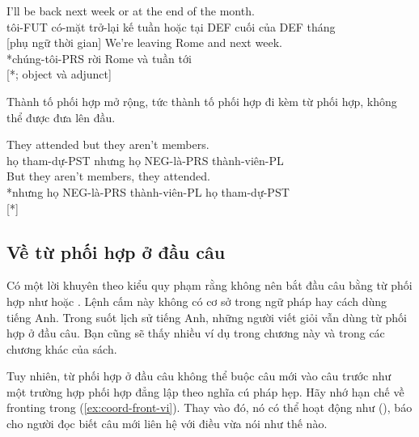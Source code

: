 \ea \label{ex:coordinate-function-vi}
    \ea \gll I'll be back next week or at the end of the month.\\
        tôi-FUT có-mặt trở-lại kế tuần hoặc tại DEF cuối của DEF tháng\\
    \glt {} [phụ ngữ thời gian]
    \ex \gll *We're leaving Rome and next week.\\
        *chúng-tôi-PRS rời Rome và tuần tới\\
    \glt {} [*; object và adjunct]
    \z
\z

Thành tố phối hợp mở rộng, tức thành tố phối hợp đi kèm từ phối hợp, không thể được đưa lên đầu.

\ea \label{ex:coord-front-vi}
    \ea \gll They attended but they aren't members.\\
        họ tham-dự-PST nhưng họ NEG-là-PRS thành-viên-PL\\
    \glt {}
    \ex \gll *But they aren't members, they attended.\\
        *nhưng họ NEG-là-PRS thành-viên-PL họ tham-dự-PST\\
    \glt {} [*]
    \z
\z

\subsection{Về từ phối hợp ở đầu câu}

Có một lời khuyên theo kiểu quy phạm rằng không nên bắt đầu câu bằng từ phối hợp như  hoặc . Lệnh cấm này không có cơ sở trong ngữ pháp hay cách dùng tiếng Anh. Trong suốt lịch sử tiếng Anh, những người viết giỏi vẫn dùng từ phối hợp ở đầu câu. Bạn cũng sẽ thấy nhiều ví dụ trong chương này và trong các chương khác của sách.

Tuy nhiên, từ phối hợp ở đầu câu không thể buộc câu mới vào câu trước như một trường hợp phối hợp đẳng lập theo nghĩa cú pháp hẹp. Hãy nhớ hạn chế về fronting trong (\ref{ex:coord-front-vi}). Thay vào đó, nó có thể hoạt động như  (), báo cho người đọc biết câu mới liên hệ với điều vừa nói như thế nào.

